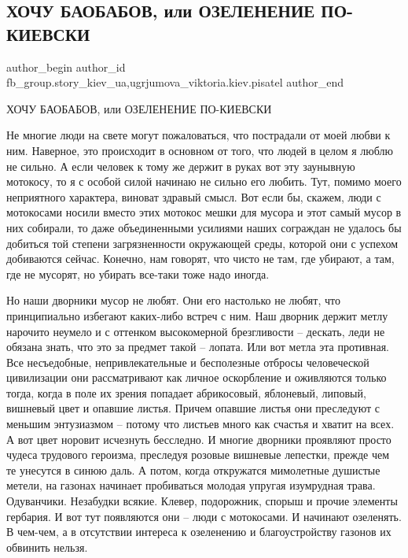  
 
 
 
 
 
\subsection{ХОЧУ БАОБАБОВ, или ОЗЕЛЕНЕНИЕ ПО-КИЕВСКИ}
\label{sec:11_05_2021.fb.fb_group.story_kiev_ua.1.hochu_baobabov}
 
\ifcmt
 author_begin
   author_id fb_group.story_kiev_ua,ugrjumova_viktoria.kiev.pisatel
 author_end
\fi

ХОЧУ БАОБАБОВ, или ОЗЕЛЕНЕНИЕ ПО-КИЕВСКИ

Не многие люди на свете могут пожаловаться, что пострадали от моей любви к ним.
Наверное, это происходит в основном от того, что людей в целом я люблю не
сильно. А если человек к тому же держит в руках вот эту заунывную мотокосу, то
я с особой силой начинаю не сильно его любить. Тут, помимо моего неприятного
характера, виноват здравый смысл. Вот если бы, скажем, люди с мотокосами носили
вместо этих мотокос мешки для мусора и этот самый мусор в них собирали, то даже
объединенными усилиями наших сограждан не удалось бы добиться той степени
загрязненности окружающей среды, которой они с успехом добиваются сейчас.
Конечно, нам говорят, что чисто не там, где убирают, а там, где не мусорят, но
убирать все-таки тоже надо иногда.

Но наши дворники мусор не любят. Они его настолько не любят, что принципиально
избегают каких-либо встреч с ним. Наш дворник держит метлу нарочито неумело и с
оттенком высокомерной брезгливости – дескать, леди не обязана знать, что это за
предмет такой – лопата. Или вот метла эта противная. Все несъедобные,
непривлекательные и бесполезные отбросы человеческой цивилизации они
рассматривают как личное оскорбление и оживляются только тогда, когда в поле их
зрения попадает абрикосовый, яблоневый, липовый, вишневый цвет и опавшие
листья. Причем опавшие листья они преследуют с меньшим энтузиазмом – потому что
листьев много как счастья и хватит на всех. А вот цвет норовит исчезнуть
бесследно. И многие дворники проявляют просто чудеса трудового героизма,
преследуя розовые вишневые лепестки, прежде чем те унесутся в синюю даль. А
потом, когда откружатся мимолетные душистые метели, на газонах начинает
пробиваться молодая упругая изумрудная трава. Одуванчики. Незабудки всякие.
Клевер, подорожник, спорыш и прочие элементы гербария. И вот тут появляются они
– люди с мотокосами. И начинают озеленять. В чем-чем, а в отсутствии интереса к
озеленению и благоустройству газонов их обвинить нельзя. 

